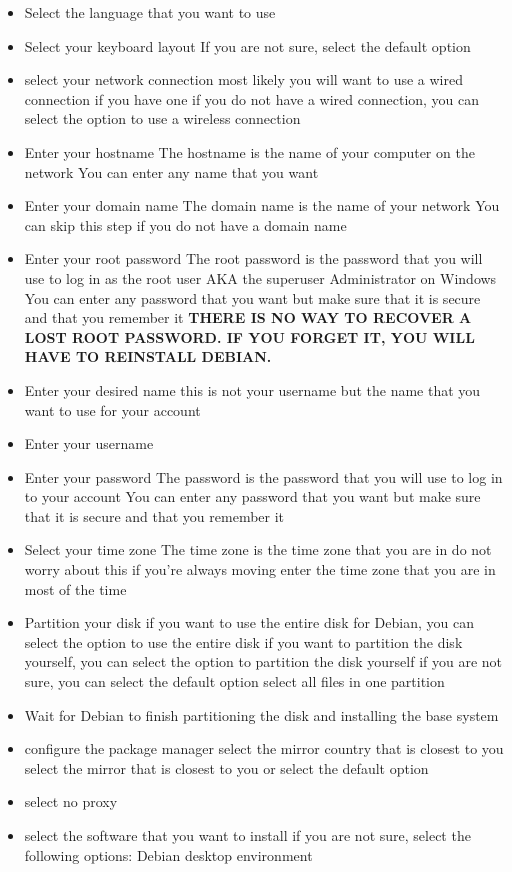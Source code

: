 \begin{itemize}
    \item Select the language that you want to use
    \item Select your keyboard layout 
    \subitem If you are not sure, select the default option
    \item select your network connection 
    \subitem most likely you will want to use a wired connection if you have one
    \subitem if you do not have a wired connection, you can select the option to use a wireless connection
    \item Enter your hostname
    \subitem The hostname is the name of your computer on the network
    \subitem You can enter any name that you want
    \item Enter your domain name
    \subitem The domain name is the name of your network 
    \subitem You can skip this step if you do not have a domain name
    \item Enter your root password
    \subitem The root password is the password that you will use to log in as the root user AKA the superuser Administrator on Windows
    \subitem You can enter any password that you want but make sure that it is secure and that you remember it 
    \subitem \textbf{THERE IS NO WAY TO RECOVER A LOST ROOT PASSWORD. IF YOU FORGET IT, YOU WILL HAVE TO REINSTALL DEBIAN.}
    \item Enter your desired name this is not your username but the name that you want to use for your account 
    \item Enter your username
    \item Enter your password
    \subitem The password is the password that you will use to log in to your account
    \subitem You can enter any password that you want but make sure that it is secure and that you remember it
    \item Select your time zone
    \subitem The time zone is the time zone that you are in do not worry about this if you're always moving enter the time zone that you are in most of the time 
    \item Partition your disk
    \subitem if you want to use the entire disk for Debian, you can select the option to use the entire disk
    \subitem if you want to partition the disk yourself, you can select the option to partition the disk yourself
    \subitem if you are not sure, you can select the default option
    \subitem select all files in one partition
    \item Wait for Debian to finish partitioning the disk and installing the base system
    \item configure the package manager
    \subitem select the mirror country that is closest to you 
    \subitem select the mirror that is closest to you or select the default option
    \item select no proxy
    \item select the software that you want to install
    \subitem if you are not sure, select the following options:
    \subsubitem Debian desktop environment
      
\end{itemize}
